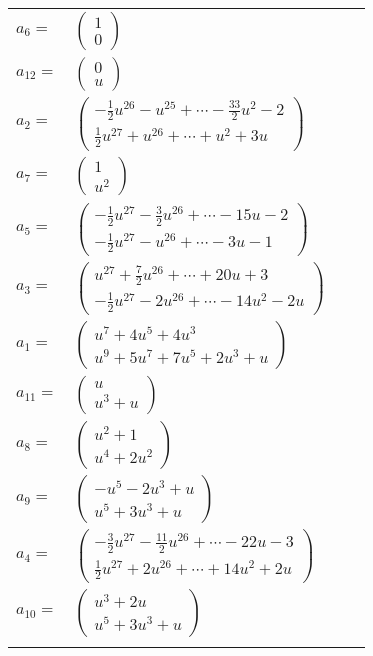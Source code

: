 \documentclass[1p]{elsarticle_modified}
\theoremstyle{definition}
\begin{document}
\begin{tabular}{m{7pt} m{180pt} m{7pt} m{180pt} }
\flushright $a_{6}=$&$\begin{pmatrix}1\\0\end{pmatrix}$ \\
\flushright $a_{12}=$&$\begin{pmatrix}0\\u\end{pmatrix}$ \\
\flushright $a_{2}=$&$\begin{pmatrix}-\frac{1}{2} u^{26}- u^{25}+\cdots-\frac{33}{2} u^2-2\\\frac{1}{2} u^{27}+u^{26}+\cdots+u^2+3 u\end{pmatrix}$ \\
\flushright $a_{7}=$&$\begin{pmatrix}1\\u^2\end{pmatrix}$ \\
\flushright $a_{5}=$&$\begin{pmatrix}-\frac{1}{2} u^{27}-\frac{3}{2} u^{26}+\cdots-15 u-2\\-\frac{1}{2} u^{27}- u^{26}+\cdots-3 u-1\end{pmatrix}$ \\
\flushright $a_{3}=$&$\begin{pmatrix}u^{27}+\frac{7}{2} u^{26}+\cdots+20 u+3\\-\frac{1}{2} u^{27}-2 u^{26}+\cdots-14 u^2-2 u\end{pmatrix}$ \\
\flushright $a_{1}=$&$\begin{pmatrix}u^7+4 u^5+4 u^3\\u^9+5 u^7+7 u^5+2 u^3+u\end{pmatrix}$ \\
\flushright $a_{11}=$&$\begin{pmatrix}u\\u^3+u\end{pmatrix}$ \\
\flushright $a_{8}=$&$\begin{pmatrix}u^2+1\\u^4+2 u^2\end{pmatrix}$ \\
\flushright $a_{9}=$&$\begin{pmatrix}- u^5-2 u^3+u\\u^5+3 u^3+u\end{pmatrix}$ \\
\flushright $a_{4}=$&$\begin{pmatrix}-\frac{3}{2} u^{27}-\frac{11}{2} u^{26}+\cdots-22 u-3\\\frac{1}{2} u^{27}+2 u^{26}+\cdots+14 u^2+2 u\end{pmatrix}$ \\
\flushright $a_{10}=$&$\begin{pmatrix}u^3+2 u\\u^5+3 u^3+u\end{pmatrix}$\\&\end{tabular}
\end{document}

